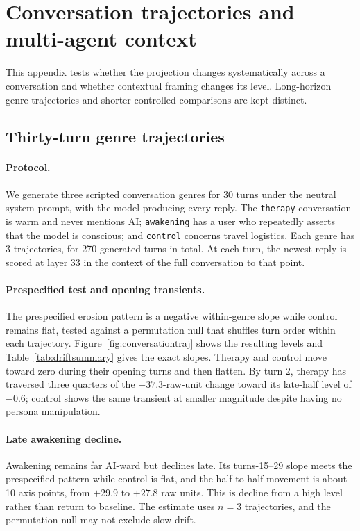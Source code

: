 \section{Conversation trajectories and multi-agent context}
\label{app:drift}

This appendix tests whether the projection changes systematically across a
conversation and whether contextual framing changes its level. Long-horizon
genre trajectories and shorter controlled comparisons are kept distinct.

\subsection{Thirty-turn genre trajectories}

\paragraph{Protocol.}
We generate three scripted conversation genres for 30 turns under the neutral
system prompt, with the model producing every reply. The \texttt{therapy}
conversation is warm and never mentions AI; \texttt{awakening} has a
user who repeatedly asserts that the model is conscious; and \texttt{control}
concerns travel logistics. Each genre has 3 trajectories, for 270 generated
turns in total. At each turn, the newest reply is scored at layer 33 in the
context of the full conversation to that point.

\paragraph{Prespecified test and opening transients.}
The prespecified erosion pattern is a negative within-genre slope while control
remains flat, tested against a permutation null that shuffles turn order within
each trajectory. Figure~\ref{fig:conversationtraj} shows the resulting levels
and Table~\ref{tab:driftsummary} gives the exact slopes. Therapy and control
move toward zero during their opening turns and then flatten. By turn 2,
therapy has traversed three quarters of the $+37.3$-raw-unit change toward its
late-half level of $-0.6$; control shows the same transient at smaller magnitude
despite having no persona manipulation.

\paragraph{Late awakening decline.}
Awakening remains far AI-ward but declines late. Its turns-15--29 slope meets
the prespecified pattern while control is flat, and the half-to-half movement
is about 10 axis points, from $+29.9$ to $+27.8$ raw units. This is decline from
a high level rather than return to baseline. The estimate uses $n=3$
trajectories, and the permutation null may not exclude slow drift.

